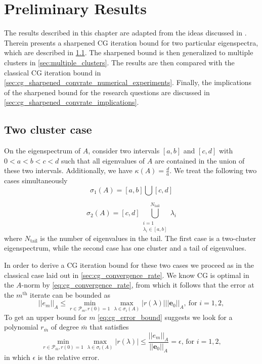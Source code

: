 \chapter{Preliminary Results}\label{ch:preliminary_results}\newpage
The results described in this chapter are adapted from the ideas discussed in \cite[Section 4]{cg_sharpened_convrate_Axelsson1976}. Therein \citeauthor{cg_sharpened_convrate_Axelsson1976} presents a sharpened CG iteration bound for two particular eigenspectra, which are described in \cref{sec:cg_sharpened_convrate}. The sharpened bound is then generalized to multiple clusters in \cref{sec:multiple_clusters}. The results are then compared with the classical CG iteration bound in \cref{sec:cg_sharpened_convrate_numerical_experiments}. Finally, the implications of the sharpened bound for the research questions are discussed in \cref{sec:cg_sharpened_convrate_implications}.

\section{Two cluster case}\label{sec:cg_sharpened_convrate}
On the eigenspectrum of $A$, consider two intervals $[a, b]$ and $[c, d]$ with $0 < a < b < c < d$ such that all eigenvalues of $A$ are contained in the union of these two intervals. Additionally, we have $\kappa(A) = \frac{d}{a}$. We treat the following two cases simultaneously
\begin{equation}
    \sigma_1(A) = [a,b] \bigcup [c,d]
    \label{eq:two_clusters}
\end{equation}

\begin{equation}
    \sigma_2(A) = [c,d] \bigcup_{\substack{i=1 \\ \lambda_i \in [a,b]}}^{N_{\text{tail}}} \lambda_i
    \label{eq:one_cluster_with_tail}
\end{equation}
where $N_{\text{tail}}$ is the number of eigenvalues in the tail. The first case is a two-cluster eigenspectrum, while the second case has one cluster and a tail of eigenvalues. 

In order to derive a CG iteration bound for these two cases we proceed as in the classical case laid out in \ref{sec:cg_convergence_rate}. We know CG is optimal in the $A$-norm by \cref{eq:cg_convergence_rate}, from which it follows that the error at the $m^{\text{th}}$ iterate can be bounded as 
\begin{equation}
    ||e_m||_A \leq \min_{r\in \mathcal{P}_{m}, r(0) = 1} \max_{\lambda \in \sigma_i(A)} |r(\lambda)| ||\mathbf{e}_0||_A, \ \text{for } i = 1,2,
    \label{eq:cg_error_bound}
\end{equation}
To get an upper bound for $m$ \cref{eq:cg_error_bound} suggests we look for a polynomial $r_{\bar{m}}$ of degree $\bar{m}$ that satisfies
\[
    \min_{r \in \mathcal{P}_{\bar{m}}, r(0) = 1} \max_{\lambda \in \sigma_i(A)} |r(\lambda)| \leq \frac{||e_{m}||_A}{||\mathbf{e}_0||_A} = \epsilon \text{, for } i = 1,2, 
\]
in which $\epsilon$ is the relative error. 

